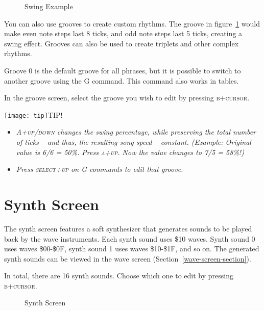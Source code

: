 \begin{figure}[htbp]
	\begin{center}
	\end{center}
	\caption{Swing Example}
	\label{fig:groove-swing}
\end{figure}

You can also use grooves to create custom rhythms. The groove in figure~\ref{fig:groove-swing} would make even note steps last 8 ticks, and odd note steps last 5 ticks, creating a swing effect. Grooves can also be used to create triplets and other complex rhythms.

Groove 0 is the default groove for all phrases, but it is possible to switch to another groove using the G command.
This command also works in tables.

In the groove screen, select the groove you wish to edit by pressing \textsc{b+cursor}.

\texttt{[image: tip]}TIP!
\begin{itemize}
	\item \textit{ \textsc{A+up/down} changes the swing percentage, while preserving the total number of ticks -- and thus, the resulting song speed -- constant. (Example: Original value is 6/6 = 50\%. Press \textsc{a+up}. Now the value changes to 7/5 = 58\%!) }
    \item \textit{ Press \textsc{select+up} on G commands to edit that groove. }
\end{itemize}

\section{Synth Screen}

The synth screen features a soft synthesizer that generates sounds to be played back by the wave instruments.
Each synth sound uses \$10 waves. Synth sound 0 uses waves \$00-\$0F, synth sound 1 uses waves \$10-\$1F, and so on. The generated synth sounds can be viewed in the wave screen (Section~\ref{wave-screen-section}).

In total, there are 16 synth sounds. Choose which one to edit by pressing \textsc{b+cursor}.

\begin{figure}[htbp]
	\begin{center}
	\end{center}
	\caption{Synth Screen}
	\label{fig:synth}
\end{figure}

